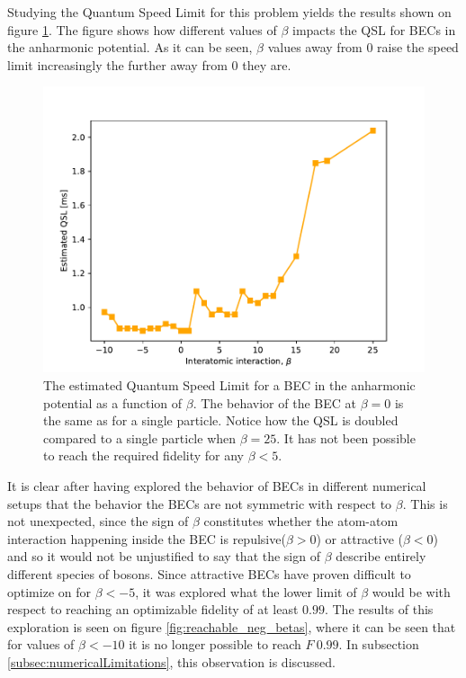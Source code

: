 \documentclass[a4paper, twocolumn]{revtex4-1}
\begin{document}
Studying the Quantum Speed Limit for this problem yields the results shown on figure \ref{fig:QSL}. The figure shows how different values of $\beta$ impacts the QSL for BECs in the anharmonic potential. As it can be seen, $\beta$ values away from 0 raise the speed limit increasingly the further away from 0 they are. \\

\begin{figure}[h]
	\includegraphics[width=\columnwidth]{graphics/exploration/QSL.pdf}
	\caption{The estimated Quantum Speed Limit for a BEC in the anharmonic potential as a function of $\beta$. The behavior of the BEC at $\beta=0$ is the same as for a single particle. Notice how the QSL is doubled compared to a single particle when $\beta=25$. It has not been possible to reach the required fidelity for any $\beta < 5$.}
	\label{fig:QSL}
\end{figure}

It is clear after having explored the behavior of BECs in different numerical setups that the behavior the BECs are not symmetric with respect to $\beta$. This is not unexpected, since the sign of $\beta$ constitutes whether the atom-atom interaction happening inside the BEC is repulsive($\beta>0$) or attractive ($\beta<0$) and so it would not be unjustified to say that the sign of $\beta$ describe entirely different species of bosons. Since attractive BECs have proven difficult to optimize on for $\beta<-5$, it was explored what the lower limit of $\beta$ would be with respect to reaching an optimizable fidelity of at least $0.99$. The results of this exploration is seen on figure \ref{fig:reachable_neg_betas}, where it can be seen that for values of $\beta<-10$ it is no longer possible to reach $F~0.99$. In subsection \ref{subsec:numericalLimitations}, this observation is discussed.
\end{document}
